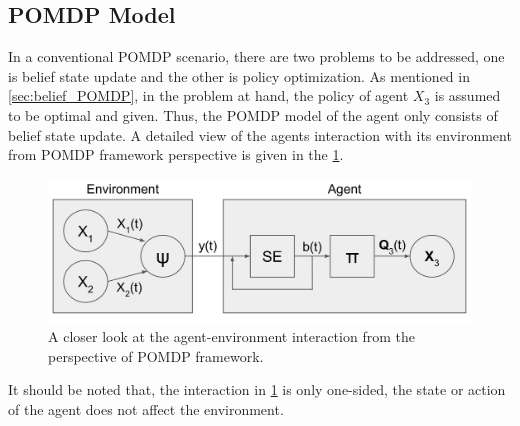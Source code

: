 \subsection{POMDP Model}
\label{sec:exp_pomdp_model}
In a conventional POMDP scenario, there are two problems to be addressed, one is belief state update and the other is policy optimization. As mentioned in \cref{sec:belief_POMDP}, in the problem at hand, the policy of agent $ X_3 $ is assumed to be optimal and given. Thus, the POMDP model of the agent only consists of belief state update. A detailed view of the agents interaction with its environment from POMDP framework perspective is given in the \cref{fig:POMDP_pers}. \\
\begin{figure}[H]
	\begin{center}
		\includegraphics[width=.75\textwidth]{figures/POMDP_graph}
		\caption{A closer look at the agent-environment interaction from the perspective of POMDP framework.}
		\label{fig:POMDP_pers}
	\end{center}
\end{figure}
It should be noted that, the interaction in \cref{fig:POMDP_pers} is only one-sided, the state or action of the agent does not affect the environment.
